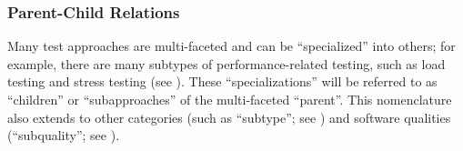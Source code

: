 
\subsubsection{Parent-Child Relations}\label{par-chd-rels}
Many test approaches are multi-faceted and can be ``specialized'' into others;
for example, there are many subtypes of performance-related testing,
such as load testing and stress testing (see ). These
``specializations'' will be referred to as ``children'' or ``subapproaches''
of the multi-faceted ``parent''. This nomenclature also extends to other
categories (such as ``subtype''; see )
and software qualities (``subquality''\ifnotpaper; see \fi).

